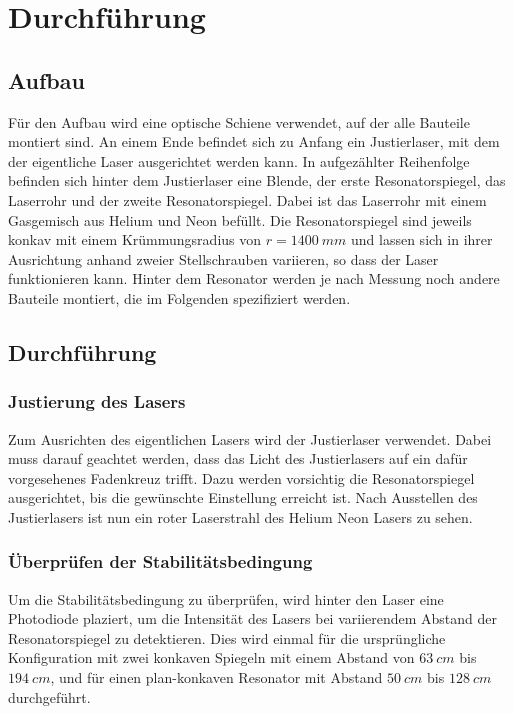 \section{Durchführung}
\label{sec:Durchführung}

\subsection{Aufbau}

Für den Aufbau wird eine optische Schiene verwendet, auf der alle Bauteile montiert sind. An einem Ende befindet sich zu Anfang ein Justierlaser, mit dem der eigentliche Laser 
ausgerichtet werden kann. In aufgezählter Reihenfolge befinden sich hinter dem Justierlaser eine Blende, der erste Resonatorspiegel, das Laserrohr und der zweite Resonatorspiegel. 
Dabei ist das Laserrohr mit einem Gasgemisch aus Helium und Neon befüllt. Die Resonatorspiegel sind jeweils konkav mit einem Krümmungsradius von $r = \SI{1400}{mm} $ und lassen 
sich in ihrer Ausrichtung anhand zweier Stellschrauben variieren, so dass der Laser funktionieren kann. Hinter dem Resonator werden je nach Messung noch andere Bauteile montiert, 
die im Folgenden spezifiziert werden. 

\subsection{Durchführung}

\subsubsection{Justierung des Lasers}
Zum Ausrichten des eigentlichen Lasers wird der Justierlaser verwendet. Dabei muss darauf geachtet werden, dass das Licht des Justierlasers auf ein dafür vorgesehenes Fadenkreuz
trifft. Dazu werden vorsichtig die Resonatorspiegel ausgerichtet, bis die gewünschte Einstellung erreicht ist. Nach Ausstellen des Justierlasers ist nun ein roter Laserstrahl des 
Helium Neon Lasers zu sehen. 

\subsubsection{Überprüfen der Stabilitätsbedingung}
Um die Stabilitätsbedingung zu überprüfen, wird hinter den Laser eine Photodiode plaziert, um die Intensität des Lasers bei variierendem Abstand der Resonatorspiegel zu detektieren.
Dies wird einmal für die ursprüngliche Konfiguration mit zwei konkaven Spiegeln mit einem Abstand von $\SI{63}{cm} $ bis $\SI{194}{cm} $, und für einen plan-konkaven Resonator mit 
Abstand $\SI{50}{cm} $ bis $\SI{128}{cm} $ durchgeführt. 

